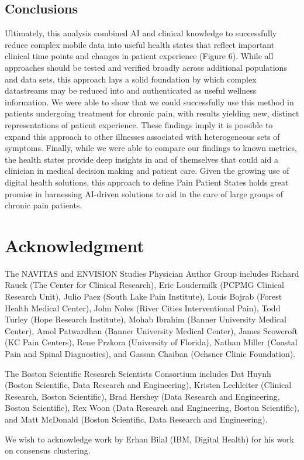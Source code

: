 \documentclass[conference]{IEEEtran}
\begin{document}
\subsection{Conclusions} 
Ultimately, this analysis combined AI and clinical knowledge to successfully reduce complex mobile data into useful health states that reflect important clinical time points and changes in patient experience (Figure 6). While all approaches should be tested and verified broadly across additional populations and data sets, this approach lays a solid foundation by which complex datastreams may be reduced into and authenticated as useful wellness information. We were able to show that we could successfully use this method in patients undergoing treatment for chronic pain, with results yielding new, distinct representations of patient experience. These findings imply it is possible to expand this approach to other illnesses associated with heterogeneous sets of symptoms. Finally, while we were able to compare our findings to known metrics, the health states provide deep insights in and of themselves that could aid a clinician in medical decision making and patient care. Given the growing use of digital health solutions, this approach to define Pain Patient States holds great promise in harnessing AI-driven solutions to aid in the care of large groups of chronic pain patients. 


\section*{Acknowledgment}
The NAVITAS and ENVISION Studies Physician Author Group includes  Richard Rauck (The Center for Clinical Research), Eric Loudermilk (PCPMG Clinical Research Unit), Julio Paez (South Lake Pain Institute), Louis Bojrab (Forest Health Medical Center), John Noles (River Cities Interventional Pain), Todd Turley (Hope Research Institute), Mohab Ibrahim (Banner University Medical Center), Amol Patwardhan (Banner University Medical Center), James Scowcroft (KC Pain Centers), Rene Przkora (University of Florida), Nathan Miller (Coastal Pain and Spinal Diagnostics), and Gassan Chaiban (Ochsner Clinic Foundation).

The Boston Scientific Research Scientists Consortium includes Dat Huynh (Boston Scientific, Data Research and Engineering), Kristen Lechleiter (Clinical Research, Boston Scientific), Brad Hershey (Data Research and Engineering, Boston Scientific), Rex Woon (Data Research and Engineering, Boston Scientific), and Matt McDonald (Boston Scientific, Data Research and Engineering). 

We wish to acknowledge work by Erhan Bilal (IBM, Digital Health) for his work on consensus clustering. 




\end{document}
